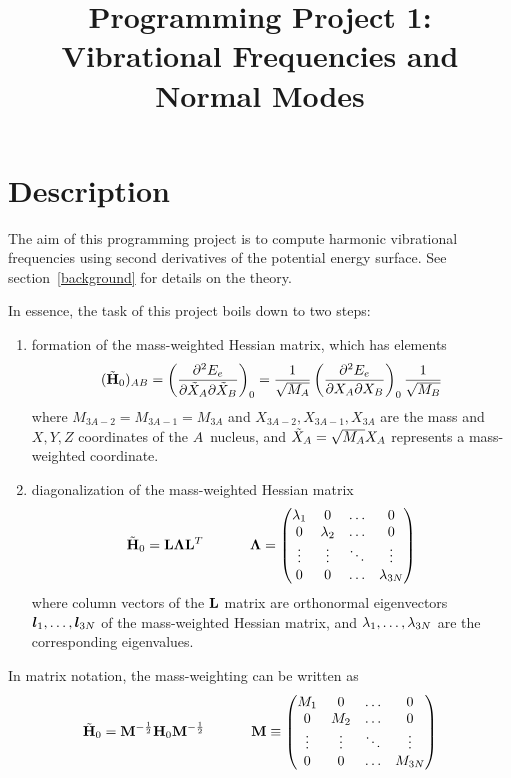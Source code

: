 \documentclass[11pt]{article}
\title{Programming Project 1: Vibrational Frequencies and Normal Modes}
\date{}
\begin{document}
\maketitle

\section*{Description}
The aim of this programming project is to compute harmonic vibrational frequencies
using second derivatives of the potential energy surface. See
section~\ref{background} for details on the theory.

In essence, the task of this project boils down to two steps:
\begin{enumerate}
    \item formation of the mass-weighted Hessian matrix, which has elements
\begin{align}
(\tilde{\mathbf{H}}_0)_{AB}
    = \left(\dfrac{\partial^2E_e}{\partial\tilde{X}_A \partial\tilde{X}_B}\right)_0
    = \dfrac{1}{\sqrt{M_A}} \left(\dfrac{\partial^2E_e}{\partial X_A\partial X_B}\right)_0 \dfrac{1}{\sqrt{M_B}}
\end{align}
where $M_{3A-2} = M_{3A-1} = M_{3A}$ and $X_{3A-2}, X_{3A-1}, X_{3A}$ are the
mass and $X,Y,Z$ coordinates of the $A$\eth\ nucleus, and
$\tilde{X}_A = \sqrt{M_A} X_A$ represents a mass-weighted coordinate.
    \item diagonalization of the mass-weighted Hessian matrix
\begin{align}
\tilde{\mathbf{H}}_0
    = \mathbf{L} \bm{\Lambda} \mathbf{L}^T \ \ \ \ \ \ \ \ \ \  \bm{\Lambda}
    = \left(\begin{matrix}\lambda_1&   0   &  \ldots  &    0     \\
            0  & \lambda_2 &  \ldots  &    0     \\
           \vdots &  \vdots  &  \ddots  &   \vdots    \\
            0  &   0   &  \ldots  & \lambda_{3N} \end{matrix}\right)
\end{align}
where column vectors of the $\mathbf{L}$ matrix are orthonormal eigenvectors
$\bm{l}_1, \ldots, \bm{l}_{3N}$ of the mass-weighted Hessian matrix, and
$\lambda_1, \ldots, \lambda_{3N}$ are the corresponding eigenvalues.
\end{enumerate}
In matrix notation, the mass-weighting can be written as
\begin{align}
    \tilde{\mathbf{H}}_0
=   \mathbf{M}^{-\frac{1}{2}} \mathbf{H}_0 \mathbf{M}^{-\frac{1}{2}}
\ \ \ \ \ \ \ \ \ \  \mathbf{M}
\equiv
    \left(\begin{matrix} M_1 &  0  & \ldots &   0    \\
          0  & M_2 & \ldots &   0    \\
         \vdots & \vdots & \ddots &  \vdots   \\
          0  & 0   & \ldots & M_{3N} \end{matrix}\right)
\end{align}
\end{document}
